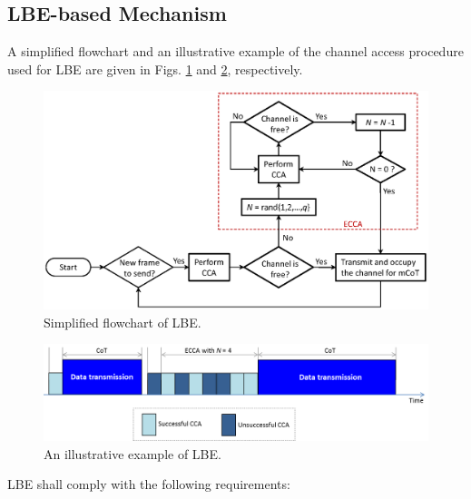 \subsection{LBE-based Mechanism}
\label{etsi-lbt:lbe}

A simplified flowchart and an illustrative example of the channel access procedure used for LBE are given in Figs. \ref{figs:LBE-flowchart} and \ref{figs:LBE-example}, respectively.
\begin{figure}[!ht]
	\centering
	\includegraphics[width=0.9\columnwidth]{figs/LBE-flowchart}
	\caption{Simplified flowchart of LBE.}
	\label{figs:LBE-flowchart}
\end{figure}
\begin{figure}[!ht]
	\centering
	\includegraphics[width=0.9\columnwidth]{figs/LBE-example}
	\caption{An illustrative example of LBE.}
	\label{figs:LBE-example}
\end{figure}


\noindent LBE shall comply with the following requirements:

